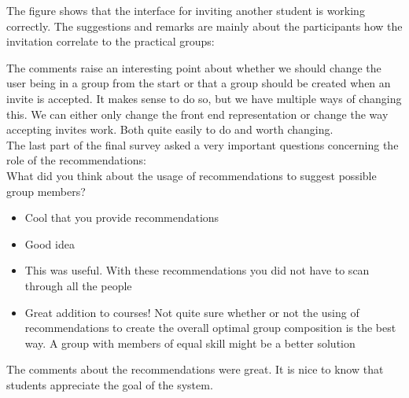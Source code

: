 The figure shows that the interface for inviting another student is working correctly.
The suggestions and remarks are mainly about the participants how the invitation correlate to the practical groups:

The comments raise an interesting point about whether we should change the user being in a group from the start or that a group should be created when an invite is accepted.
It makes sense to do so, but we have multiple ways of changing this.
We can either only change the front end representation or change the way accepting invites work.
Both quite easily to do and worth changing.\\

The last part of the final survey asked a very important questions concerning the role of the recommendations:\\
What did you think about the usage of recommendations to suggest possible group members?\\
\begin{itemize}
\item Cool that you provide recommendations
\item Good idea
\item This was useful. With these recommendations you did not have to scan through all the people
\item Great addition to courses! Not quite sure whether or not the using of recommendations to create the overall optimal group composition is the best way. A group with members of equal skill might be a better solution
\end{itemize}
The comments about the recommendations were great.
It is nice to know that students appreciate the goal of the system.\\

